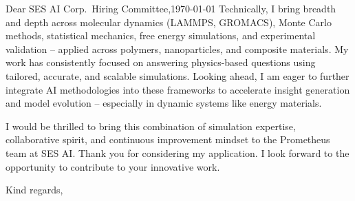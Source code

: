 \documentclass[12pt]{HHUletter}
\begin{document}
\begin{letter}{Dear SES AI Corp.~Hiring Committee,\hfill\today}
    Technically, I bring breadth and depth across molecular dynamics (LAMMPS, GROMACS), Monte Carlo methods, statistical mechanics, free energy simulations, and experimental validation -- applied across polymers, nanoparticles, and composite materials. My work has consistently focused on answering physics-based questions using tailored, accurate, and scalable simulations. Looking ahead, I am eager to further integrate AI methodologies into these frameworks to accelerate insight generation and model evolution -- especially in dynamic systems like energy materials.

    I would be thrilled to bring this combination of simulation expertise, collaborative spirit, and continuous improvement mindset to the Prometheus team at SES AI. Thank you for considering my application. I look forward to the opportunity to contribute to your innovative work.

		\closing{Kind regards,}
		
		
		
		
	\end{letter}
	
\end{document}
